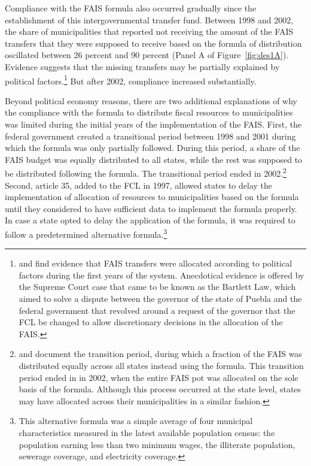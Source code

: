 \documentclass[dv_diss_main.tex]{subfiles}
\begin{document}
  Compliance with the FAIS formula also occurred gradually since the establishment of this intergovernmental transfer fund. Between 1998 and 2002, the share of municipalities that reported not receiving the amount of the FAIS transfers that they were supposed to receive based on the formula of distribution oscillated between 26 percent and 90 percent (Panel A of Figure~\ref{fig:des1A}). Evidence suggests that the missing transfers may be partially explained by political factors.\footnote{\cite{diaz2016political} and \cite{Valderrama} find evidence that FAIS transfers were allocated according to political factors during the first years of the system. Anecdotical evidence is offered by the Supreme Court case that came to be known as the Bartlett Law, which aimed to solve a dispute between the governor of the state of Puebla and the federal government that revolved around a request of the governor that the FCL be changed to allow discretionary decisions in the allocation of the FAIS.} But after 2002, compliance increased substantially. 

Beyond political economy reasons, there are two additional explanations of why the compliance with the formula to distribute fiscal resources to municipalities was limited during the initial years of the implementation of the FAIS. First, the federal government created a transitional period between 1998 and 2001 during which the formula was only partially followed. During this period, a share of the FAIS budget was equally distributed to all states, while the rest was supposed to be distributed following the formula. The transitional period ended in 2002.\footnote{ \cite{mogollon2002discrecion} and \cite{diaz2016political} document the transition period, during which a fraction of the FAIS was distributed equally across all states instead using the formula. This transition period ended in in 2002, when the entire FAIS pot was allocated on the sole basis of the formula. Although this process occurred at the state level, states may have allocated across their municipalities in a similar fashion.} Second, article 35, added to the FCL in 1997, allowed states to delay the implementation of allocation of resources to municipalities based on the formula until they considered to have sufficient data to implement the formula properly. In case a state opted to delay the application of the formula, it was required to follow a predetermined alternative formula.\footnote{This alternative formula was a simple average of four municipal characteristics measured in the latest available population census: the population earning less than two minimum wages, the illiterate population, sewerage coverage, and electricity coverage.}
\end{document}
